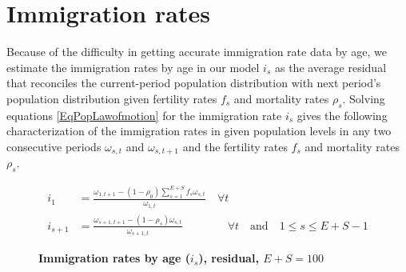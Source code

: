 \section{Immigration rates}\label{SecDemogImm}

  Because of the difficulty in getting accurate immigration rate data by age, we estimate the immigration rates by age in our model $i_s$ as the average residual that reconciles the current-period population distribution with next period's population distribution given fertility rates $f_s$ and mortality rates $\rho_s$. Solving equations \eqref{EqPopLawofmotion} for the immigration rate $i_s$ gives the following characterization of the immigration rates in given population levels in any two consecutive periods $\omega_{s,t}$ and $\omega_{s,t+1}$ and the fertility rates $f_s$ and mortality rates $\rho_s$.

  \begin{equation}\label{EqPopImmRates}
    \begin{split}
      i_1 &= \frac{\omega_{1,t+1} - (1 - \rho_0)\sum_{s=1}^{E+S}f_s\omega_{s,t}}{\omega_{1,t}}\quad\forall t \\
      i_{s+1} &= \frac{\omega_{s+1,t+1} - (1 - \rho_s)\omega_{s,t}}{\omega_{s+1,t}}\qquad\qquad\forall t\quad\text{and}\quad 1\leq s \leq E+S-1
    \end{split}
  \end{equation}

  \begin{figure}[htbp]\centering \captionsetup{width=4.0in}
    \caption{\label{FigImmRates}\textbf{Immigration rates by age ($i_s$), residual, $E+S=100$}}
  \end{figure}

